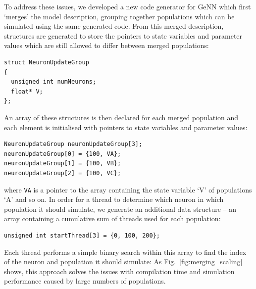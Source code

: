 \documentclass[9pt,twocolumn,twoside,lineno]{pnas-new}
\begin{document}
To address these issues, we developed a new code generator for GeNN which first `merges' the model description, grouping together populations which can be simulated using the same generated code.
From this merged description, structures are generated to store the pointers to state variables and parameter values which are still allowed to differ between merged populations:
%
\begin{lstlisting}
struct NeuronUpdateGroup
{
  unsigned int numNeurons;
  float* V;  
};
\end{lstlisting}
%
An array of these structures is then declared for each merged population and each element is initialised with pointers to state variables and parameter values:
%
\begin{lstlisting}
NeuronUpdateGroup neuronUpdateGroup[3];
neuronUpdateGroup[0] = {100, VA};
neuronUpdateGroup[1] = {100, VB};
neuronUpdateGroup[2] = {100, VC};
\end{lstlisting}
%
where \lstinline{VA} is a pointer to the array containing the state variable `V' of populations `A' and so on.
In order for a thread to determine which neuron in which population it should simulate, we generate an additional data structure -- an array containing a cumulative sum of threads used for each population:
\begin{lstlisting}
unsigned int startThread[3] = {0, 100, 200};
\end{lstlisting}
Each thread performs a simple binary search within this array to find the index of the neuron and population it should simulate:
As Fig.~\ref{fig:merging_scaling} shows, this approach solves the issues with compilation time and simulation performance caused by large numbers of populations.
\end{document}

